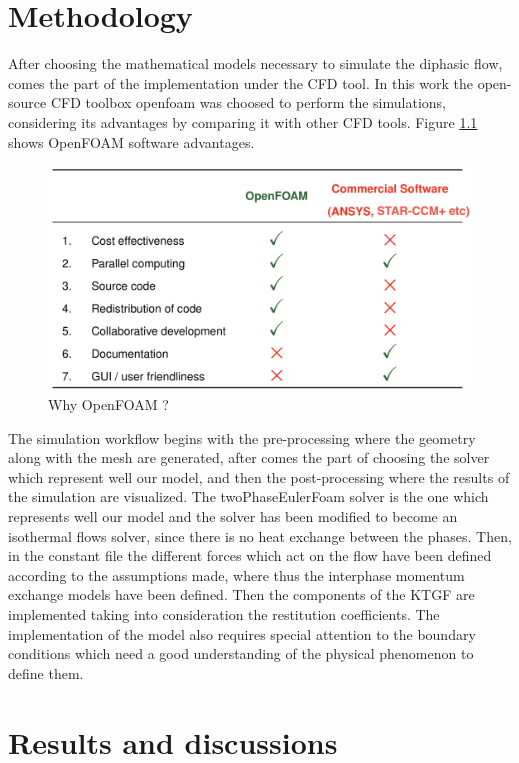 \documentclass[11pt]{report}
\begin{document}
\chapter{Methodology}
%
After choosing the mathematical models necessary to simulate the diphasic flow, comes the part of the implementation under the CFD tool. 
%
In this work the open-source CFD toolbox openfoam was choosed to perform the simulations, considering its advantages by comparing it with other CFD tools.
%
Figure \ref{openfoam} shows OpenFOAM software advantages.\\
%
\begin{figure}[ht!]
\begin{center}
\includegraphics[trim=0cm 0cm 0cm 0cm,clip,scale=0.45]{figs/0F2.png}
\caption{ Why OpenFOAM ?}
\label{openfoam}
\end{center}
\end{figure} 
%
The simulation workflow begins with the pre-processing where the geometry along with the mesh are generated, 
%
after comes the part of choosing the solver which represent well our model, and then the post-processing where the results of the simulation are visualized.
%
The twoPhaseEulerFoam solver is the one which represents well our model and  the solver has been modified to become an isothermal flows solver, since there is no heat exchange between the phases. 
%
Then, in the constant file the different forces which act on the flow have been defined according to the assumptions made, where thus the interphase momentum exchange models have been defined.
%
Then the components of the KTGF are implemented taking into consideration the restitution coefficients. 
%
The implementation of the model also requires special attention to the boundary conditions which need a good understanding of the physical phenomenon to define them.
\chapter{Results and discussions} \label{results}
%
\end{document}
